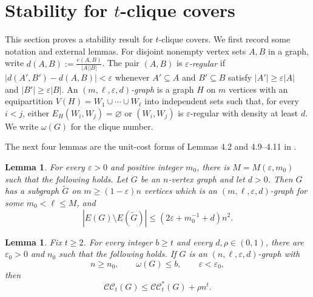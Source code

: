 \documentclass[11pt]{article}
\numberwithin{equation}{section}
\newtheorem{lemma}[theorem]{Lemma}
\theoremstyle{remark}
\newcommand{\CC}{\mathcal{CC}}
\newcommand{\CCstar}{\mathcal{CC}^{*}}
\begin{document}
\section{Stability for \texorpdfstring{\(t\)}{t}-clique covers}\label{cov:sec:stability}

This section proves a stability result for \(t\)-clique covers. We first record some notation and external lemmas.
For disjoint nonempty vertex sets \(A,B\) in a graph, write \(d(A,B):=\frac{e(A,B)}{|A||B|}\).
The pair \((A,B)\) is \emph{$\varepsilon$-regular} if \(|d(A',B')-d(A,B)|<\varepsilon\)
whenever \(A'\subseteq A\) and \(B'\subseteq B\) satisfy \(|A'|\ge\varepsilon|A|\) and \(|B'|\ge\varepsilon|B|\).
An \emph{$(m,\ell,\varepsilon,d)$-graph} is a graph \(H\) on \(m\) vertices with an equipartition
\(V(H)=W_1\cup\cdots\cup W_\ell\) into independent sets such that, for every \(i<j\),
either \(E_H(W_i,W_j)=\varnothing\) or \((W_i,W_j)\) is \(\varepsilon\)-regular with density at least \(d\).
We write \(\omega(G)\) for the clique number.

The next four lemmas are the unit-cost forms of Lemmas 4.2 and 4.9--4.11 in \cite{BHKNW}.

\begin{lemma}
  \label{cov:lem:cleaning}
For every \(\varepsilon>0\) and positive integer \(m_0\),
there is \(M=M(\varepsilon,m_0)\) such that the following holds.
Let \(G\) be an \(n\)-vertex graph and let \(d>0\).
Then \(G\) has a subgraph \(\widetilde G\) on \(m\ge(1-\varepsilon)n\) vertices
which is an \((m,\ell,\varepsilon,d)\)-graph for some \(m_0<\ell\le M\), and
\begin{equation*}
|E(G)\setminus E(\widetilde G)|
 \le (2\varepsilon+m_0^{-1}+d)n^2.
\end{equation*}
\end{lemma}

\begin{lemma}
  \label{cov:lem:cleaned-rounding}
Fix \(t\ge2\).  For every integer \(b\ge t\) and every \(d,\rho\in(0,1)\),
there are \(\varepsilon_0>0\) and \(n_0\) such that the following holds.
If \(G\) is an \((n,\ell,\varepsilon,d)\)-graph with
\begin{equation*}
n\ge n_0,\qquad \omega(G)\le b,\qquad \varepsilon<\varepsilon_0,
\end{equation*}
then
\begin{equation*}
\CC_t(G)\le \CCstar_t(G)+\rho n^t.
\end{equation*}
\end{lemma}
\end{document}
